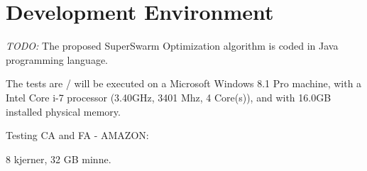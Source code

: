\section{Development Environment}

\emph{\color{blue}TODO:} 
The proposed SuperSwarm Optimization algorithm is coded in Java programming language.  





The tests are / will be executed on a Microsoft Windows 8.1 Pro machine, with a Intel Core i-7 processor (3.40GHz, 3401 Mhz, 4 Core(s)), and with 16.0GB installed physical memory.

Testing CA and FA - AMAZON:

8 kjerner, 32 GB minne.



